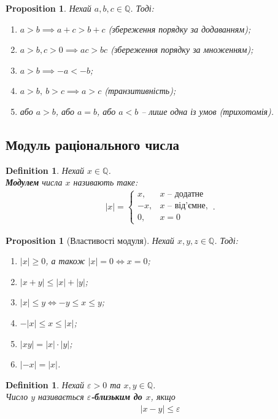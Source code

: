 \documentclass[a4paper, 14pt]{extarticle}
\theoremstyle{theoremdd}
\theoremstyle{theoremdd}
\newtheorem{definition}[theorem]{Definition}
\theoremstyle{theoremdd}
\theoremstyle{theoremdd}
\theoremstyle{theoremdd}
\theoremstyle{theoremdd}
\theoremstyle{theoremdd}
\theoremstyle{theoremdd}
\theoremstyle{theoremdd}
\theoremstyle{theoremdd}
\newtheorem{proposition}[theorem]{Proposition}
\theoremstyle{theoremdd}
\theoremstyle{theoremdd}
\theoremstyle{theoremdd}
\theoremstyle{theoremdd}
\theoremstyle{theoremdd}
\theoremstyle{theoremdd}
\begin{document}
\begin{proposition}
Нехай $a,b,c \in \mathbb{Q}$. Тоді:
\begin{enumerate}[nosep,wide=0pt,label={\arabic*)}]
\item $a > b \implies a + c > b + c$ (збереження порядку за додаванням);
\item $a > b, c > 0 \implies ac > bc$ (збереження порядку за множенням);
\item $a > b \implies -a < -b$;
\item $a > b, \ b > c \implies a > c$ (транзитивність);
\item або $a > b$, або $a = b$, або $a < b$ -- лише одна із умов (трихотомія).
\end{enumerate}
\end{proposition}

\subsection{Модуль раціонального числа}
\begin{definition}
Нехай $x \in \mathbb{Q}$.\\
\textbf{Модулем} числа $x$ називають таке:
\begin{align*}
|x| = \begin{cases} x, & x \text{ -- додатне} \\ -x, & x \text{ -- від'ємне}, \\ 0, & x = 0 \end{cases}.
\end{align*}
\end{definition}

\begin{proposition}[Властивості модуля]
Нехай $x,y,z \in \mathbb{Q}$. Тоді:
\begin{enumerate}[nosep,wide=0pt,label={\arabic*)}]
\item $|x| \geq 0$, а також $|x| = 0 \iff x = 0$;
\item $|x+y| \leq |x| + |y|$;
\item $|x| \leq y \iff -y \leq x \leq y$;
\item $-|x| \leq x \leq |x|$;
\item $|xy| = |x| \cdot |y|$;
\item $|-x| = |x|$.
\end{enumerate}
\end{proposition}

\begin{definition}
Нехай $\varepsilon > 0$ та $x,y \in \mathbb{Q}$.\\
Число $y$ називається \textbf{$\varepsilon$-близьким до $x$}, якщо
\begin{align*}
|x-y| \leq \varepsilon
\end{align*} 
\end{definition}
\end{document}
